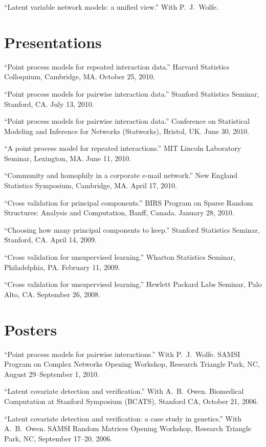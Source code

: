 \documentclass[overlapped,line,letterpaper]{res}
\begin{document}
\begin{resume}
``Latent variable network models: a unified view.''
With P.\ J.\ Wolfe.


\section{\bf Presentations}

``Point process models for repeated interaction data.''
Harvard Statistics Colloquium, Cambridge, MA.  October 25, 2010.

``Point process models for pairwise interaction data.''
Stanford Statistics Seminar, Stanford, CA.  July 13, 2010.

``Point process models for pairwise interaction data.''
Conference on Statistical Modeling and Inference for Networks (Statworks),
Bristol, UK.  June 30, 2010.

``A point process model for repeated interactions.''
MIT Lincoln Laboratory Seminar, Lexington, MA. June 11, 2010.

``Community and homophily in a corporate e-mail network.''
New England Statistics Symposium, Cambridge, MA.  April 17, 2010.

``Cross validation for principal components.''
BIRS Program on Sparse Random Structures: Analysis and Computation,
Banff, Canada.
January 28, 2010.

``Choosing how many principal components to keep.''
Stanford Statistics Seminar, Stanford, CA.  April 14, 2009.

``Cross validation for unsupervised learning.''
Wharton Statistics Seminar, Philadelphia, PA.  February 11, 2009.

``Cross validation for unsupervised learning.''
Hewlett Packard Labs Seminar, Palo Alto, CA.  September 26, 2008.


\section{\bf Posters}

``Point process models for pairwise interactions.''
With P.\ J.\ Wolfe.
SAMSI Program on Complex Networks Opening Workshop,
Research Triangle Park, NC,
August 29--September 1, 2010.

``Latent covariate detection and verification.''
With A.\ B.\ Owen.
Biomedical Computation at Stanford Symposium (BCATS),
Stanford CA,
October 21, 2006.

``Latent covariate detection and verification: a case study in genetics.''
With A.\ B.\ Owen.
SAMSI Random Matrices Opening Workshop,
Research Triangle Park, NC,
September 17--20, 2006.



\end{resume}
\end{document}
